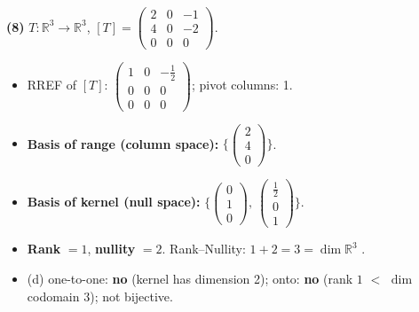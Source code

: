 \noindent\textbf{(8)} $T:\mathbb{R}^3\to\mathbb{R}^3$, $[T]=\begin{pmatrix}2 & 0 & -1 \\ 4 & 0 & -2 \\ 0 & 0 & 0\end{pmatrix}$.
\begin{itemize}
\item RREF of $[T]$: $\begin{pmatrix}1 & 0 & - \frac{1}{2} \\ 0 & 0 & 0 \\ 0 & 0 & 0\end{pmatrix}$; pivot columns: 1.
\item \textbf{Basis of range (column space):} $\Big\{\begin{pmatrix}2 \\ 4 \\ 0\end{pmatrix}\Big\}$.
\item \textbf{Basis of kernel (null space):} $\Big\{\begin{pmatrix}0 \\ 1 \\ 0\end{pmatrix},\ \begin{pmatrix}\frac{1}{2} \\ 0 \\ 1\end{pmatrix}\Big\}$.
\item \textbf{Rank} $=1$, \textbf{nullity} $=2$. Rank--Nullity: $1+2=3=\dim\mathbb{R}^3$ \checkmark.
\item (d) one-to-one: \textbf{no} (kernel has dimension 2); onto: \textbf{no} (rank $1$ $<$ $\dim$ codomain $3$); not bijective.
\end{itemize}
